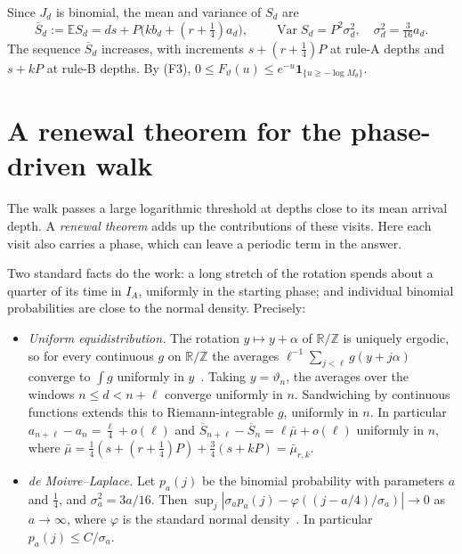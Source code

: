 \documentclass[11pt]{article}
\theoremstyle{definition}
\theoremstyle{remark}
\newcommand{\Z}{\mathbb Z}
\newcommand{\R}{\mathbb R}
\newcommand{\one}{\mathbf 1}
\newcommand{\E}{\mathbb E}
\begin{document}
Since $J_d$ is binomial, the mean and variance of $S_d$ are
\[
 \overline S_d:=\E S_d=ds+P\big(kb_d+(r+\tfrac14)a_d\big),\qquad
 \operatorname{Var}S_d=P^2\sigma_d^2,\quad \sigma_d^2=\tfrac3{16}a_d .
\]
The sequence $\overline S_d$ increases, with increments $s+(r+\frac14)P$ at rule-A depths
and $s+kP$ at rule-B depths. By (F3), $0\le F_\vartheta(u)\le
e^{-u}\one_{\{u\ge-\log M_\theta\}}$.

\section{A renewal theorem for the phase-driven walk}\label{sec:renewal}

The walk passes a large logarithmic threshold at depths close to its
mean arrival depth. A \emph{renewal theorem} adds up the contributions
of these visits. Here each visit also carries a phase, which can leave
a periodic term in the answer.

Two standard facts do the work: a long stretch of the rotation spends
about a quarter of its time in $I_A$, uniformly in the starting phase;
and individual binomial probabilities are close to the normal density.
Precisely:
\begin{itemize}
\item[(E)] \emph{Uniform equidistribution.} The rotation
 $y\mapsto y+\alpha$ of $\R/\Z$ is uniquely ergodic, so for every
 continuous $g$ on $\R/\Z$ the averages $\ell^{-1}\sum_{j<\ell}g(y+j\alpha)$
 converge to $\int g$ uniformly in $y$~\cite[Thm.~6.19]{Walters}. Taking
 $y=\vartheta_n$, the averages over the windows $n\le d<n+\ell$ converge
 uniformly in $n$. Sandwiching by continuous functions extends this to
 Riemann-integrable $g$, uniformly in $n$. In particular
 $a_{n+\ell}-a_n=\frac\ell4+o(\ell)$ and $\overline S_{n+\ell}-\overline S_n=\ell\bar\mu+o(\ell)$
 uniformly in $n$, where
 $\bar\mu=\frac14(s+(r+\frac14)P)+\frac34(s+kP)=\bar\mu_{r,k}$.
\item[(LLT)] \emph{de Moivre--Laplace.} Let $p_a(j)$ be the binomial
 probability with parameters $a$ and $\frac14$, and $\sigma_a^2=3a/16$. Then
 $\sup_j|\sigma_ap_a(j)-\varphi((j-a/4)/\sigma_a)|\to0$ as $a\to\infty$,
 where $\varphi$ is the standard normal density~\cite[Ch.~VII]{Petrov}.
 In particular $p_a(j)\le C/\sigma_a$.
\end{itemize}
\end{document}
